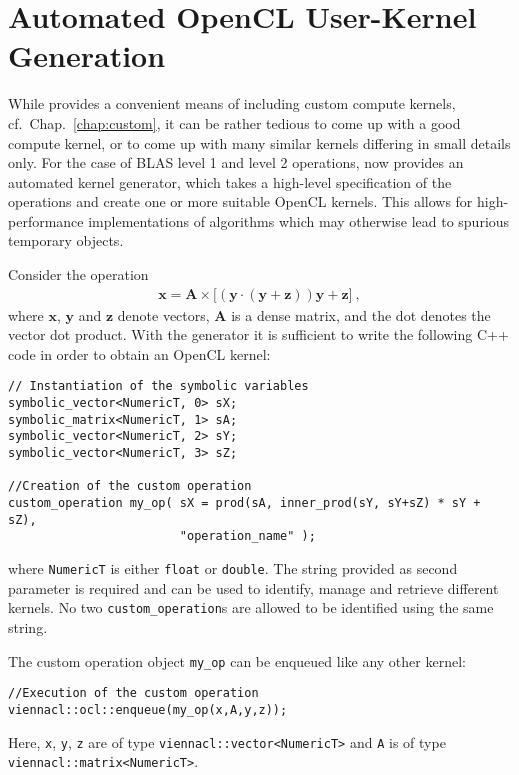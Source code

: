 \chapter{Automated OpenCL User-Kernel Generation} \label{chap:kernel-generation}

While {\ViennaCL} provides a convenient means of including custom {\OpenCL} compute kernels, cf.~Chap.~\ref{chap:custom},
it can be rather tedious to come up with a good compute kernel, or to come up with many similar kernels differing in small details only.
For the case of BLAS level 1 and level 2 operations, {\ViennaCL} now provides an automated kernel generator, which takes a high-level specification of the operations and create one or more suitable OpenCL kernels.
This allows for high-performance implementations of algorithms which may otherwise lead to spurious temporary objects.

Consider the operation
\begin{align*}
\mathbf{x} = \mathbf{A} \times \bigl[ (\mathbf{y} \cdot (\mathbf{y}+\mathbf{z}))\mathbf{y} + \mathbf{z} \bigr] \ ,
\end{align*}
where $\mathbf{x}$, $\mathbf{y}$ and $\mathbf{z}$ denote vectors, $\mathbf{A}$ is a dense matrix, and the dot denotes the vector dot product.
With the generator it is sufficient to write the following C++ code in order to obtain an OpenCL kernel:
\begin{lstlisting}
// Instantiation of the symbolic variables
symbolic_vector<NumericT, 0> sX;
symbolic_matrix<NumericT, 1> sA;
symbolic_vector<NumericT, 2> sY;
symbolic_vector<NumericT, 3> sZ;

//Creation of the custom operation
custom_operation my_op( sX = prod(sA, inner_prod(sY, sY+sZ) * sY + sZ),
                        "operation_name" );
\end{lstlisting}
where \lstinline|NumericT| is either \lstinline|float| or \lstinline|double|.
The string provided as second parameter is required and can be used to identify, manage and retrieve different kernels.
No two \lstinline|custom_operation|s are allowed to be identified using the same string.

The custom operation object \lstinline|my_op| can be enqueued like any other kernel:
\begin{lstlisting}
//Execution of the custom operation
viennacl::ocl::enqueue(my_op(x,A,y,z));
\end{lstlisting}
Here, \lstinline|x|, \lstinline|y|, \lstinline|z| are of type \lstinline|viennacl::vector<NumericT>| and \lstinline|A| is of type \lstinline|viennacl::matrix<NumericT>|.



